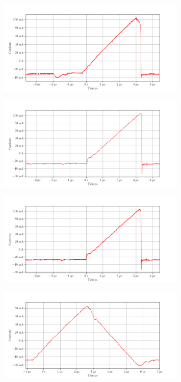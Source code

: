 \begin{figure}[ht]
    \centering
    \includegraphics[width=0.8\textwidth]{images/capturas-osciloscopio/17-11-2022/21.png}
    \caption{}
    \label{fig:osc:21}
\end{figure}

\begin{figure}[ht]
    \centering
    \includegraphics[width=0.8\textwidth]{images/capturas-osciloscopio/17-11-2022/22.png}
    \caption{}
    \label{fig:osc:22}
\end{figure}

\begin{figure}[ht]
    \centering
    \includegraphics[width=0.8\textwidth]{images/capturas-osciloscopio/17-11-2022/23.png}
    \caption{}
    \label{fig:osc:23}
\end{figure}

\begin{figure}[ht]
    \centering
    \includegraphics[width=0.8\textwidth]{images/capturas-osciloscopio/17-11-2022/24.png}
    \caption{}
    \label{fig:osc:24}
\end{figure}

